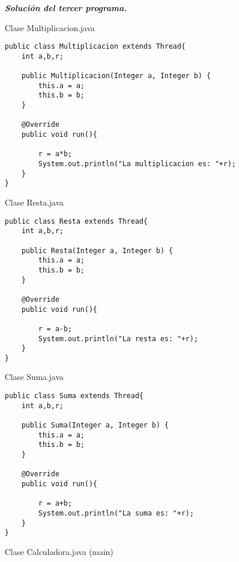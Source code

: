 \textbf{\textit{Solución del tercer programa.}}

\begin{center}
Clase Multiplicacion.java
\end{center}

\begin{verbatim}
public class Multiplicacion extends Thread{
    int a,b,r;

    public Multiplicacion(Integer a, Integer b) {
        this.a = a;
        this.b = b;
    }
    
    @Override
    public void run(){
        
        r = a*b;
        System.out.println("La multiplicacion es: "+r);
    }
}
\end{verbatim} \vspace{1cm}

\begin{center}
Clase Resta.java
\end{center}

\begin{verbatim}
public class Resta extends Thread{
    int a,b,r;

    public Resta(Integer a, Integer b) {
        this.a = a;
        this.b = b;
    }
    
    @Override
    public void run(){
        
        r = a-b;
        System.out.println("La resta es: "+r);
    }
}
\end{verbatim} \vspace{1cm}

\begin{center}
Clase Suma.java
\end{center}

\begin{verbatim}
public class Suma extends Thread{
    int a,b,r;

    public Suma(Integer a, Integer b) {
        this.a = a;
        this.b = b;
    }
    
    @Override
    public void run(){
        
        r = a+b;
        System.out.println("La suma es: "+r);
    }
}
\end{verbatim} \vspace{1cm}

\begin{center}
Clase Calculadora.java (main)
\end{center}

